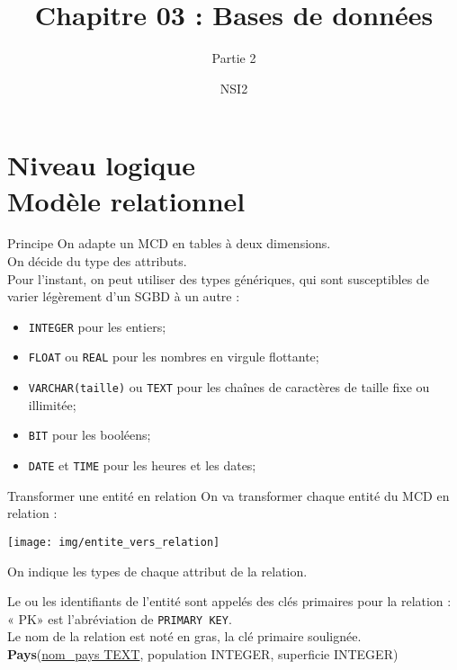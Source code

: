 \documentclass[10pt]{nsibeamer}
\title{Chapitre 03 : Bases de données}
\subtitle{Partie 2}
\author{NSI2}
\begin{document}
	\maketitle
    \section{Niveau logique\\ Modèle relationnel}
\begin{frame}{Principe}
On adapte un MCD en tables à deux dimensions.\\
On décide du type des attributs.\\
Pour l'instant, on peut utiliser des types génériques, qui sont susceptibles de varier légèrement d'un SGBD à un autre :
\begin{itemize}
	\item	\texttt{INTEGER} pour les entiers;
	\item	\texttt{FLOAT} ou \texttt{REAL} pour les nombres en virgule flottante;
    \item	\texttt{VARCHAR(taille)} ou \texttt{TEXT} pour les chaînes de caractères de taille fixe ou illimitée;
    \item 	\texttt{BIT} pour les booléens;
    \item 	\texttt{DATE} et \texttt{TIME} pour les heures et les dates;
\end{itemize}
\end{frame}


\begin{frame}{Transformer une entité en relation}
	On va transformer chaque entité du MCD en \alert{relation} :
	\begin{center}
		\texttt{[image: img/entite\_vers\_relation]}
	\end{center}
	On indique les types de chaque attribut de la relation.

	Le ou les identifiants de l'entité sont appelés des \alert{clés primaires} pour la relation : « PK» est l'abréviation de \texttt{PRIMARY KEY}.\\
	Le nom de la relation est noté en gras, la clé primaire soulignée.\\

	\textbf{Pays}(\uline{nom\_pays TEXT}, population INTEGER, superficie INTEGER)\\
\end{frame}
\end{document}
